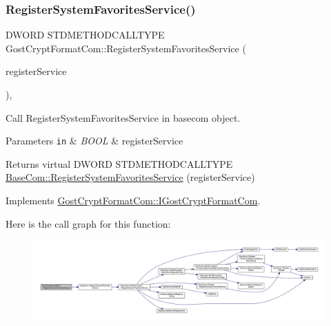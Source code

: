 \subsubsection{\texorpdfstring{Register\+System\+Favorites\+Service()}{RegisterSystemFavoritesService()}}
{\footnotesize\ttfamily D\+W\+O\+RD S\+T\+D\+M\+E\+T\+H\+O\+D\+C\+A\+L\+L\+T\+Y\+PE Gost\+Crypt\+Format\+Com\+::\+Register\+System\+Favorites\+Service (\begin{DoxyParamCaption}\item[{B\+O\+OL}]{register\+Service }\end{DoxyParamCaption})\hspace{0.3cm}{\ttfamily [inline]}, {\ttfamily [virtual]}}



Call Register\+System\+Favorites\+Service in basecom object. 


\begin{DoxyParams}[1]{Parameters}
\mbox{\tt in}  & {\em B\+O\+OL} & register\+Service \\
\hline
\end{DoxyParams}
\begin{DoxyReturn}{Returns}
virtual D\+W\+O\+RD S\+T\+D\+M\+E\+T\+H\+O\+D\+C\+A\+L\+L\+T\+Y\+PE \hyperlink{class_base_com_aa5bd0c7ed2b559f9be436622febb3dfb}{Base\+Com\+::\+Register\+System\+Favorites\+Service} (register\+Service) 
\end{DoxyReturn}


Implements \hyperlink{interface_gost_crypt_format_com_1_1_i_gost_crypt_format_com}{Gost\+Crypt\+Format\+Com\+::\+I\+Gost\+Crypt\+Format\+Com}.

Here is the call graph for this function\+:
\nopagebreak
\begin{figure}[H]
\begin{center}
\leavevmode
\includegraphics[width=350pt]{class_gost_crypt_format_com_a0ecf79dfffe668439df4ad209095ab9c_cgraph}
\end{center}
\end{figure}
\mbox{\label{class_gost_crypt_format_com_a8664a77c7bd4507f88109e4358465218}} 

